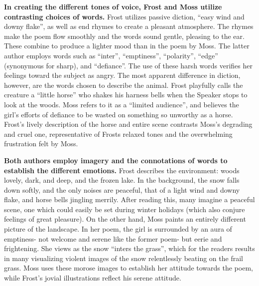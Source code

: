 \begin{enumerate}
\begin{itemize}
\begin{enumerate}
\textbf{In creating the different tones of voice, Frost and Moss utilize contrasting choices of words.} Frost utilizes passive diction, “easy wind and downy flake”, as well as end rhymes to create a pleasant atmosphere. The rhymes make the poem flow smoothly and the words sound gentle, pleasing to the ear. These combine to produce a lighter mood than in the poem by Moss. The latter author employs words such as “inter”, “emptiness”, “polarity”, “edge” (synonymous for sharp), and “defiance”. The use of these harsh words verifies her feelings toward the subject as angry. The most apparent difference in diction, however, are the words chosen to describe the animal. Frost playfully calls the creature a “little horse” who shakes his harness bells when the Speaker stops to look at the woods. Moss refers to it as a “limited audience”, and believes the girl's efforts of defiance to be wasted on something so unworthy as a horse. Frost's lively description of the horse and entire scene contrasts Moss's degrading and cruel one, representative of Frosts relaxed tones and the overwhelming frustration felt by Moss. 

\textbf{Both authors employ imagery and the connotations of words to establish the different emotions.} Frost describes the environment: woods lovely, dark, and deep, and the frozen lake. In the background, the snow falls down softly, and the only noises are peaceful, that of a light wind and downy flake, and horse bells jingling merrily. After reading this, many imagine a peaceful scene, one which could easily be set during winter holidays (which also conjure feelings of great pleasure). On the other hand, Moss paints an entirely different picture of the landscape. In her poem, the girl is surrounded by an aura of emptiness- not welcome and serene like the former poem- but eerie and frightening. She views as the snow “inters the grass”, which for the readers results in many visualizing violent images of the snow relentlessly beating on the frail grass. Moss uses these morose images to establish her attitude towards the poem, while Frost's jovial illustrations reflect his serene attitude. 


\end{enumerate}
\end{itemize}
\end{enumerate}
